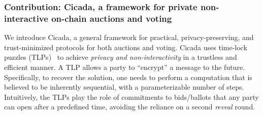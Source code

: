 \subsubsection{Contribution: Cicada, a framework for private non-interactive on-chain auctions and voting}

We introduce Cicada, a general framework for practical, privacy-preserving, and trust-minimized protocols for both auctions and voting. 
Cicada uses time-lock puzzles (TLPs)~\cite{RSW96} to achieve \emph{privacy and non-interactivity} in a trustless and efficient manner.
A TLP allows a party to ``encrypt'' a message to the future. Specifically, to recover the solution, one needs to perform a computation that is believed to be inherently sequential, with a parameterizable number of steps.
Intuitively, the TLPs play the role of commitments to bids/ballots that any party can open after a predefined time, avoiding the reliance on a second \emph{reveal} round. 



